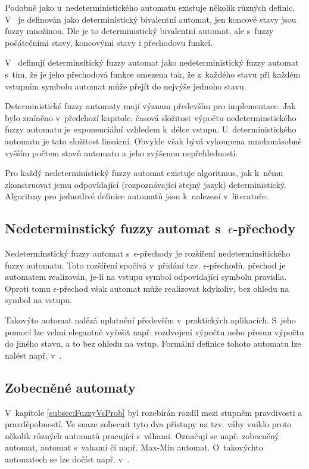 Podobně jako u~nedeterministického automatu existuje několik různých definic. V~\cite{Bel-DetFuzAut} je definován jako deterministický bivalentní automat, jen koncové stavy jsou fuzzy množinou. Dle \cite{LiLiLi-RelAmoSevTypFuzAut} je to deterministický bivalentní automat, ale s~fuzzy počátečními stavy, koncovými stavy i přechodovu funkcí.

V~\cite{GonGar-FuzzLangInfRanAccGuzzAutPumLemDetProc} definují determinsitický fuzzy automat jako nedeterministický fuzzy automat s~tím, že je jeho přechodová funkce omezena tak, že z~každého stavu při každém vstupním symbolu automat může přejít do nejvýše jednoho stavu.

Deterministické fuzzy automaty mají význam především pro implementace. Jak bylo zmíněno v~předchozí kapitole, časová složitost výpočtu nedeterminstického fuzzy automatu je exponenciální vzhledem k~délce vstupu. U~deterministického automatu je tato složitost lineární. Obvykle však bývá vykoupena mnohonásobně vyšším počtem stavů automatu a jeho zvýšenou nepřehledností.

Pro každý nedeterministický fuzzy automat existuje algoritmus, jak k~němu zkonstruovat jemu odpovídající (rozpoznávající stejný jazyk) deterministický. Algoritmy pro jednotlivé definice automatů jsou k~nalezení v~literatuře.

\subsection{Nedeterminstický fuzzy automat s~$\epsilon$-přechody}
Nedeterminstický fuzzy automat s~$\epsilon$-přechody je rozšíření nedeterminsitického fuzzy automatu. Toto rozšíření spočívá v~přidání tzv. $\epsilon$-přechodů.  přechod je automatem realizován, je-li na vstupu symbol odpovídající symbolu pravidla. Oproti tomu $\epsilon$-přechod však automat může realizovat kdykoliv, bez ohledu na symbol na vstupu.

Takovýto automat nalézá uplatnění především v~praktických aplikacích. S~jeho pomocí lze velmi elegantně vyřešit např. rozdvojení výpočtu nebo přesun výpočtu do jiného stavu, a to bez ohledu na vstup. Formální definice tohoto automatu lze nalést např. v~\cite{SnaKepAbrHas-AproxStriMatchFuzzAut, LiLiLi-RelAmoSevTypFuzAut}. 

\subsection{Zobecněné automaty}
V~kapitole \ref{subsec:FuzzyVsProb} byl rozebírán rozdíl mezi stupněm pravdivosti a pravděpobností. Ve snaze zobecnit tyto dva přístupy na tzv. váhy vniklo proto několik různých automatů pracující s~váhami. Označují se např. zobecněný automat, automat s~vahami či např. Max-Min automat. O~takovýchto automatech se lze dočíst např. v~\cite{MorMal-FuzzyAutLang, DooKre-NewDirFuzzAut, San-MaxAut}. 

